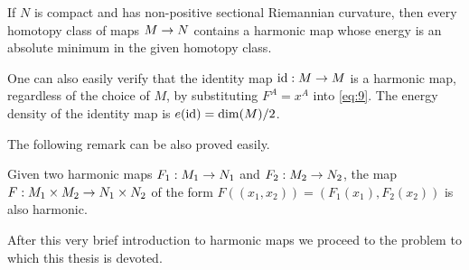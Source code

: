 \begin{theorem}\label{thm:Eells-Sampson}
  If $N$ is compact and has non-positive sectional Riemannian
  curvature, then every homotopy class of maps $M\rightarrow N$ contains a
  harmonic map whose energy is an absolute minimum in the given
  homotopy class.
\end{theorem}

\begin{remark}\label{rem:1}
  One can also easily verify that the identity map $\text{id}:M\rightarrow M$ is a
  harmonic map, regardless of the choice of $M$, by substituting
  $F^A=x^A$ into \eqref{eq:9}. The energy density of the identity map
  is $e(\text{id})=\dim(M)/2$.
\end{remark}

The following remark can be also proved easily.

\begin{remark}\label{rem:2}
  Given two harmonic maps $F_1:M_1\rightarrow N_1$ and $F_2:M_2\rightarrow N_2$, the
  map $F:M_1\times M_2\rightarrow N_1\times N_2$ of the form
  $F((x_1,x_2))=(F_1(x_1),F_2(x_2))$ is also harmonic.
\end{remark}

After this very brief introduction to harmonic maps we proceed to the
problem to which this thesis is devoted.


